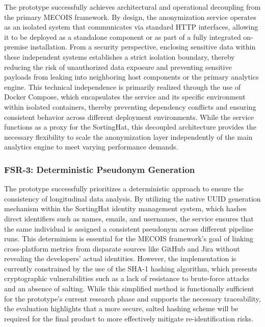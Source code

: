 The prototype successfully achieves architectural and operational decoupling from the primary MECOIS framework. By design, the anonymization service operates as an isolated system that communicates via standard \ac{HTTP} interfaces, allowing it to be deployed as a standalone component or as part of a fully integrated on-premise installation. From a security perspective, enclosing sensitive data within these independent systems establishes a strict isolation boundary, thereby reducing the risk of unauthorized data exposure and preventing sensitive payloads from leaking into neighboring host components or the primary analytics engine. This technical independence is primarily realized through the use of Docker Compose, which encapsulates the service and its specific environment within isolated containers, thereby preventing dependency conflicts and ensuring consistent behavior across different deployment environments. While the service functions as a proxy for the SortingHat, this decoupled architecture provides the necessary flexibility to scale the anonymization layer independently of the main analytics engine to meet varying performance demands.

\subsubsection{FSR-3: Deterministic Pseudonym	Generation}

The prototype successfully prioritizes a deterministic approach to ensure the consistency of longitudinal data analysis. By utilizing the native \ac{UUID} generation mechanism within the SortingHat identity management system, which hashes direct identifiers such as names, emails, and usernames, the service ensures that the same individual is assigned a consistent pseudonym across different pipeline runs. This determinism is essential for the MECOIS framework's goal of linking cross-platform metrics from disparate sources like GitHub and Jira without revealing the developers' actual identities. However, the implementation is currently constrained by the use of the SHA-1 hashing algorithm, which presents cryptographic vulnerabilities such as a lack of resistance to brute-force attacks and an absence of salting. While this simplified method is functionally sufficient for the prototype's current research phase and supports the necessary traceability, the evaluation highlights that a more secure, salted hashing scheme will be required for the final product to more effectively mitigate re-identification risks.


